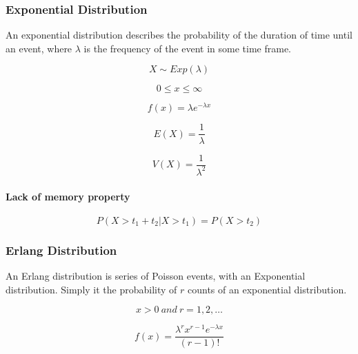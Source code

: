 \documentclass[a4paper, 10pt]{article}
\begin{document}
	\subsubsection{Exponential Distribution}

	An exponential distribution describes the probability of the duration of time until an event, where \(\lambda\) is the frequency of the event in some time frame.

		\begin{equation*}
		X\sim Exp(\lambda)
		\end{equation*}

		\begin{equation*}
		0\leq x\leq \infty
		\end{equation*}

		\begin{equation*}
		f(x)=\lambda e^{-\lambda x}
		\end{equation*}

		\begin{equation*}
		E(X)=\frac{1}{\lambda}
		\end{equation*}

		\begin{equation*}
		V(X)=\frac{1}{\lambda ^2}
		\end{equation*}

	\paragraph{Lack of memory property}

	\begin{equation*}
		P(X>t_1+t_2|X>t_1)=P(X>t_2)
	\end{equation*}

	\subsubsection{Erlang Distribution}

	An Erlang distribution is series of Poisson events, with an Exponential distribution. Simply it the probability of \(r\) counts of an exponential distribution.

		\begin{equation*}
		x>0 ~and~ r=1,2,\ldots
		\end{equation*}

		\begin{equation*}
		f(x)=\frac{\lambda ^r x^{r-1} e^{-\lambda x}}{(r-1)!}
		\end{equation*}
\end{document}
